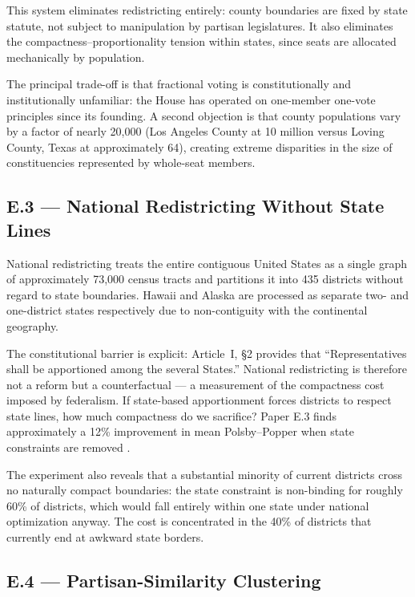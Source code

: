 This system eliminates redistricting entirely: county boundaries are fixed by
state statute, not subject to manipulation by partisan legislatures.  It also
eliminates the compactness--proportionality tension within states, since seats
are allocated mechanically by population.

The principal trade-off is that fractional voting is constitutionally and
institutionally unfamiliar: the House has operated on one-member one-vote
principles since its founding.  A second objection is that county populations
vary by a factor of nearly 20,000 (Los Angeles County at 10 million versus
Loving County, Texas at approximately 64), creating extreme disparities in
the size of constituencies represented by whole-seat members.

\subsection{E.3 --- National Redistricting Without State Lines}

National redistricting treats the entire contiguous United States as a single
graph of approximately 73,000 census tracts and partitions it into 435
districts without regard to state boundaries.  Hawaii and Alaska are processed
as separate two- and one-district states respectively due to non-contiguity
with the continental geography.

The constitutional barrier is explicit: Article~I, \S2 provides that
``Representatives shall be apportioned among the several States.''  National
redistricting is therefore not a reform but a counterfactual --- a measurement
of the compactness cost imposed by federalism.  If state-based apportionment
forces districts to respect state lines, how much compactness do we sacrifice?
Paper E.3 finds approximately a 12\% improvement in mean Polsby--Popper when
state constraints are removed \citep{dellaLibera2026e3}.

The experiment also reveals that a substantial minority of current districts
cross no naturally compact boundaries: the state constraint is non-binding for
roughly 60\% of districts, which would fall entirely within one state under
national optimization anyway.  The cost is concentrated in the 40\% of
districts that currently end at awkward state borders.

\subsection{E.4 --- Partisan-Similarity Clustering}

